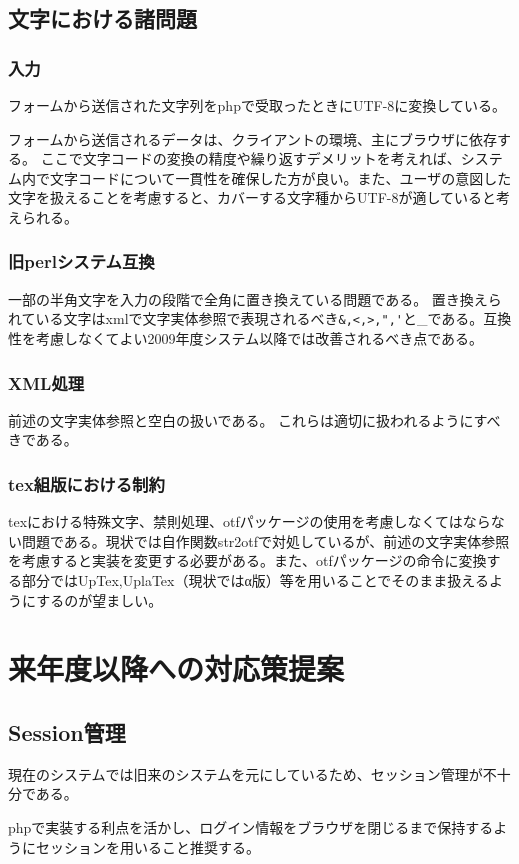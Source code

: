 \documentclass[titlepage]{jsarticle}
\begin{document}
\subsection{文字における諸問題}
\subsubsection{入力}
フォームから送信された文字列をphpで受取ったときにUTF-8に変換している。

フォームから送信されるデータは、クライアントの環境、主にブラウザに依存する。
ここで文字コードの変換の精度や繰り返すデメリットを考えれば、システム内で文字コードについて一貫性を確保した方が良い。また、ユーザの意図した文字を扱えることを考慮すると、カバーする文字種からUTF-8が適していると考えられる。

\subsubsection{旧perlシステム互換}
一部の半角文字を入力の段階で全角に置き換えている問題である。
置き換えられている文字はxmlで文字実体参照で表現されるべき\verb|&,<,>,",'|と\_である。互換性を考慮しなくてよい2009年度システム以降では改善されるべき点である。
\subsubsection{XML処理}
前述の文字実体参照と空白の扱いである。
これらは適切に扱われるようにすべきである。
\subsubsection{tex組版における制約}
texにおける特殊文字、禁則処理、otfパッケージの使用を考慮しなくてはならない問題である。現状では自作関数str2otfで対処しているが、前述の文字実体参照を考慮すると実装を変更する必要がある。また、otfパッケージの命令に変換する部分ではUpTex,UplaTex（現状ではα版）等を用いることでそのまま扱えるようにするのが望ましい。
\section{来年度以降への対応策提案}

\subsection{Session管理}
現在のシステムでは旧来のシステムを元にしているため、セッション管理が不十分である。

phpで実装する利点を活かし、ログイン情報をブラウザを閉じるまで保持するようにセッションを用いること推奨する。
\end{document}
